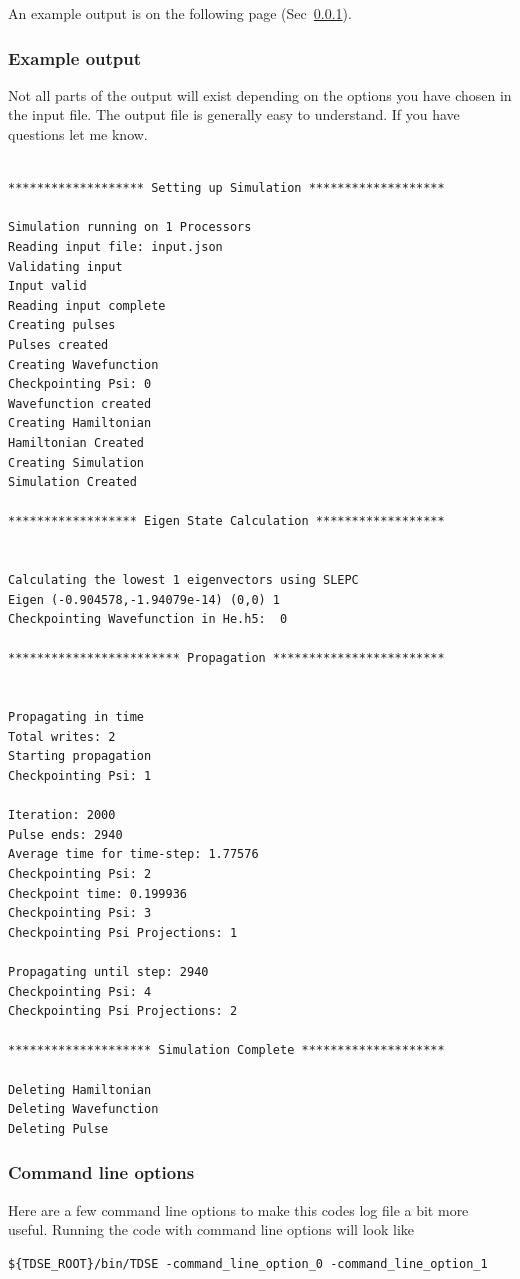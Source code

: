 \documentclass{article}
\begin{document}
An example output is on the following page (Sec~\ref{ssub:example_output}).
\newpage
\subsubsection{Example output}
\label{ssub:example_output}
Not all parts of the output will exist depending on the options you have chosen in the input file. The output file is generally easy to understand. If you have questions let me know.
\begin{verbatim}

******************* Setting up Simulation *******************

Simulation running on 1 Processors
Reading input file: input.json
Validating input
Input valid
Reading input complete
Creating pulses
Pulses created
Creating Wavefunction
Checkpointing Psi: 0
Wavefunction created
Creating Hamiltonian
Hamiltonian Created
Creating Simulation
Simulation Created

****************** Eigen State Calculation ******************


Calculating the lowest 1 eigenvectors using SLEPC
Eigen (-0.904578,-1.94079e-14) (0,0) 1
Checkpointing Wavefunction in He.h5:  0

************************ Propagation ************************


Propagating in time
Total writes: 2
Starting propagation
Checkpointing Psi: 1

Iteration: 2000
Pulse ends: 2940
Average time for time-step: 1.77576
Checkpointing Psi: 2
Checkpoint time: 0.199936
Checkpointing Psi: 3
Checkpointing Psi Projections: 1

Propagating until step: 2940
Checkpointing Psi: 4
Checkpointing Psi Projections: 2

******************** Simulation Complete ********************

Deleting Hamiltonian
Deleting Wavefunction
Deleting Pulse
\end{verbatim}
\newpage

\subsubsection{Command line options} %
\label{ssub:command_line_options}
Here are a few command line options to make this codes log file a bit more useful. Running the code with command line options will look like
\begin{verbatim}
${TDSE_ROOT}/bin/TDSE -command_line_option_0 -command_line_option_1
\end{verbatim}
\end{document}
